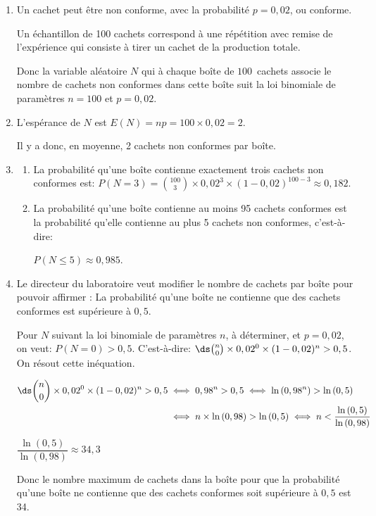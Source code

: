 \begin{enumerate}
	\item %
Un cachet peut être non conforme, avec la probabilité $p=0,02$, ou conforme.	
	
Un échantillon de 100 cachets correspond à une répétition avec remise de l'expérience qui consiste à tirer un cachet de la production totale.

Donc la variable aléatoire $N$ qui à chaque boîte de $100$~cachets associe le nombre de cachets non conformes dans cette boîte suit  la loi binomiale de paramètres $n=100$ et $p=0,02$.
	
	\item L'espérance de $N$ est $E(N)=np=100\times 0,02 =2$.
	
Il y a donc, en moyenne, 2 cachets non conformes par boîte.
	
	\item %
	\begin{enumerate}
		\item %
La probabilité qu'une boîte contienne exactement trois cachets non conformes est:
$P(N=3)= \binom{100}{3} \times 0,02^3 \times (1-0,02)^{100-3}\approx 0,182$.
		\item La probabilité qu'une boîte contienne au moins 95 cachets conformes est la probabilité qu'elle contienne  au plus 5 cachets non conformes, c'est-à-dire:

$P(N\leqslant 5)\approx 0,985$.
	\end{enumerate}
	\item Le directeur du laboratoire veut modifier le nombre de cachets par boîte pour pouvoir affirmer : \og La probabilité qu'une boîte ne contienne que des cachets conformes est supérieure à $0,5$\fg.
	

Pour $N$ suivant la loi binomiale de paramètres $n$, à déterminer, et $p=0,02$, on veut: $P(N=0) >0,5$. C'est-à-dire:
$\ds\binom{n}{0} \times 0,02^0 \times (1-0,02)^{n} > 0,5$.
On résout cette inéquation.

$\begin{aligned}
\ds\binom{n}{0} \times 0,02^0 \times (1-0,02)^{n} > 0,5
& \iff
0,98^n > 0,5
\iff
\ln \left (0,98^n \right ) > \ln\left (0,5\right )\\
& \iff
n \times \ln \left (0,98 \right ) > \ln\left (0,5\right )
\iff
n < \dfrac{\ln\left (0,5\right )}{\ln \left (0,98 \right )}
\end{aligned}$

$\dfrac{\ln\left (0,5\right )}{\ln \left (0,98 \right )}\approx 34,3$

Donc le nombre maximum de cachets dans la boîte pour que la  probabilité qu'une boîte ne contienne que des cachets conformes soit supérieure à $0,5$ est 34.
\end{enumerate}

